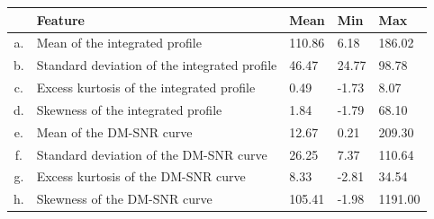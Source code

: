 \documentclass[12pt,a4paper]{article}
\begin{document}
\begin{minipage}{\linewidth}
    \begin{tabular}{ |c|p{220pt}|p{34pt}|p{30pt}|p{36pt}|  }\hline

           & Feature                                      & Mean   & Min   & Max     \\
        \hline
        a. & Mean of the integrated profile               & 110.86 & 6.18  & 186.02  \\
        \hline
        b. & Standard deviation of the integrated profile & 46.47  & 24.77 & 98.78   \\
        \hline
        c. & Excess kurtosis of the integrated profile    & 0.49   & -1.73 & 8.07    \\
        \hline
        d. & Skewness of the integrated profile           & 1.84   & -1.79 & 68.10   \\
        \hline
        e. & Mean of the DM-SNR curve                     & 12.67  & 0.21  & 209.30  \\
        \hline
        f. & Standard deviation of the DM-SNR curve       & 26.25  & 7.37  & 110.64  \\
        \hline
        g. & Excess kurtosis of the DM-SNR curve          & 8.33   & -2.81 & 34.54   \\
        \hline
        h. & Skewness of the DM-SNR curve                 & 105.41 & -1.98 & 1191.00 \\
        \hline
    \end{tabular}
\end{minipage}
\vspace{1cm}
\end{document}
